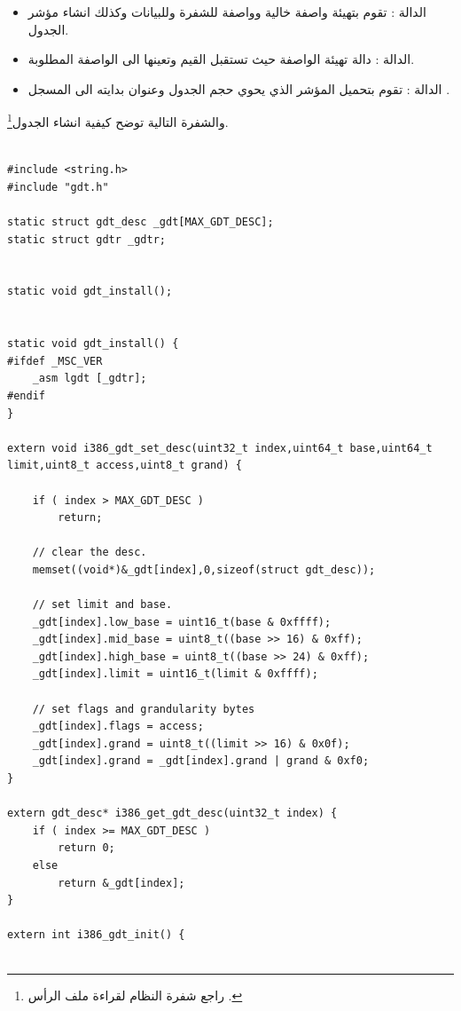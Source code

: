 \documentclass[document.tex]{subfiles}
\begin{document}
\begin{itemize}
\item الدالة : تقوم بتهيئة واصفة خالية وواصفة للشفرة وللبيانات وكذلك انشاء مؤشر الجدول.
\item الدالة : دالة تهيئة الواصفة حيث تستقبل القيم وتعينها الى الواصفة المطلوبة.
\item الدالة : تقوم بتحميل المؤشر الذي يحوي حجم الجدول وعنوان بدايته الى المسجل .  
\end{itemize}
والشفرة التالية توضح كيفية انشاء الجدول\footnote{راجع شفرة النظام لقراءة ملف الرأس .}.
\begin{english}

\lstset{numberstyle=\tiny,numbersep=5pt,tabsize=2,extendedchars=true,breaklines=true,frame=b,showspaces=false, showtabs=false,xleftmargin=10pt,framexleftmargin=10pt,framexrightmargin=5pt,framexbottommargin=4pt,showstringspaces=false,language=C++}

\begin{lstlisting}[label=gdt_c,caption=\en{hal/gdt.cpp:Install GDT}]

#include <string.h>
#include "gdt.h"
 
static struct gdt_desc _gdt[MAX_GDT_DESC];
static struct gdtr _gdtr;


static void gdt_install();


static void gdt_install() {
#ifdef _MSC_VER
	_asm lgdt [_gdtr];
#endif
}

extern void i386_gdt_set_desc(uint32_t index,uint64_t base,uint64_t limit,uint8_t access,uint8_t grand) {
	
	if ( index > MAX_GDT_DESC )
		return;
		
	// clear the desc.
	memset((void*)&_gdt[index],0,sizeof(struct gdt_desc));
	
	// set limit and base.
	_gdt[index].low_base = uint16_t(base & 0xffff);
	_gdt[index].mid_base = uint8_t((base >> 16) & 0xff);
	_gdt[index].high_base = uint8_t((base >> 24) & 0xff);
	_gdt[index].limit = uint16_t(limit & 0xffff);
	
	// set flags and grandularity bytes
	_gdt[index].flags = access;
	_gdt[index].grand = uint8_t((limit >> 16) & 0x0f);
	_gdt[index].grand = _gdt[index].grand | grand & 0xf0;
}

extern gdt_desc* i386_get_gdt_desc(uint32_t index) {
	if ( index >= MAX_GDT_DESC )
		return 0;
	else
		return &_gdt[index];
}

extern int i386_gdt_init() {
	

\end{lstlisting}
\end{english}
\end{document}
